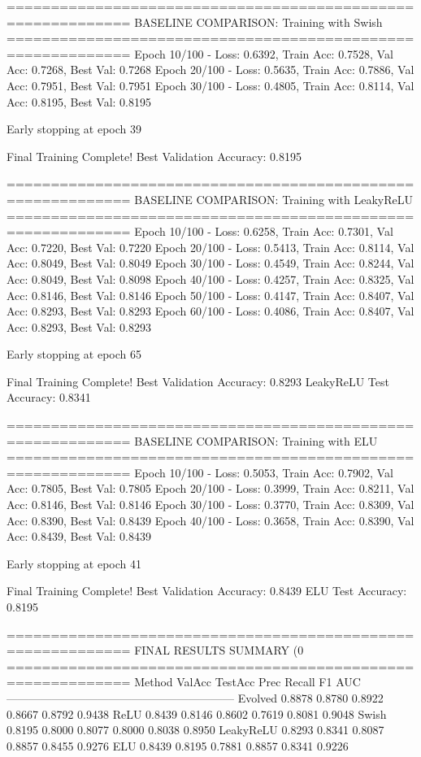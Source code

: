 ============================================================
BASELINE COMPARISON: Training with Swish
============================================================
Epoch  10/100 - Loss: 0.6392, Train Acc: 0.7528, Val Acc: 0.7268, Best Val: 0.7268
Epoch  20/100 - Loss: 0.5635, Train Acc: 0.7886, Val Acc: 0.7951, Best Val: 0.7951
Epoch  30/100 - Loss: 0.4805, Train Acc: 0.8114, Val Acc: 0.8195, Best Val: 0.8195

Early stopping at epoch 39

Final Training Complete!
Best Validation Accuracy: 0.8195

============================================================
BASELINE COMPARISON: Training with LeakyReLU
============================================================
Epoch  10/100 - Loss: 0.6258, Train Acc: 0.7301, Val Acc: 0.7220, Best Val: 0.7220
Epoch  20/100 - Loss: 0.5413, Train Acc: 0.8114, Val Acc: 0.8049, Best Val: 0.8049
Epoch  30/100 - Loss: 0.4549, Train Acc: 0.8244, Val Acc: 0.8049, Best Val: 0.8098
Epoch  40/100 - Loss: 0.4257, Train Acc: 0.8325, Val Acc: 0.8146, Best Val: 0.8146
Epoch  50/100 - Loss: 0.4147, Train Acc: 0.8407, Val Acc: 0.8293, Best Val: 0.8293
Epoch  60/100 - Loss: 0.4086, Train Acc: 0.8407, Val Acc: 0.8293, Best Val: 0.8293

Early stopping at epoch 65

Final Training Complete!
Best Validation Accuracy: 0.8293
LeakyReLU Test Accuracy: 0.8341

============================================================
BASELINE COMPARISON: Training with ELU
============================================================
Epoch  10/100 - Loss: 0.5053, Train Acc: 0.7902, Val Acc: 0.7805, Best Val: 0.7805
Epoch  20/100 - Loss: 0.3999, Train Acc: 0.8211, Val Acc: 0.8146, Best Val: 0.8146
Epoch  30/100 - Loss: 0.3770, Train Acc: 0.8309, Val Acc: 0.8390, Best Val: 0.8439
Epoch  40/100 - Loss: 0.3658, Train Acc: 0.8390, Val Acc: 0.8439, Best Val: 0.8439

Early stopping at epoch 41

Final Training Complete!
Best Validation Accuracy: 0.8439
ELU Test Accuracy: 0.8195

============================================================
FINAL RESULTS SUMMARY (0%
============================================================
Method             ValAcc     TestAcc    Prec       Recall     F1         AUC
------------------------------------------------------------
Evolved            0.8878     0.8780     0.8922     0.8667     0.8792     0.9438
ReLU               0.8439     0.8146     0.8602     0.7619     0.8081     0.9048
Swish              0.8195     0.8000     0.8077     0.8000     0.8038     0.8950
LeakyReLU          0.8293     0.8341     0.8087     0.8857     0.8455     0.9276
ELU                0.8439     0.8195     0.7881     0.8857     0.8341     0.9226

